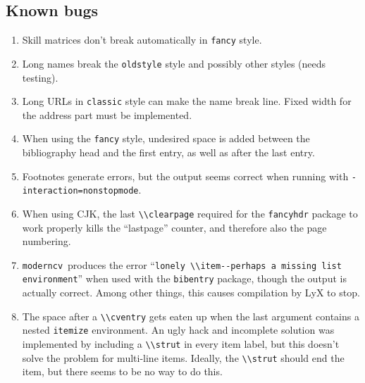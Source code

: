 \documentclass[a4paper, 11pt]{article}
\newcommand{\code}[1]{\lstinline!#1!}
\newcommand{\moderncv}{\code{moderncv}}
\newcommand{\Moderncv}{\moderncv~}
\begin{document}
\subsection{Known bugs}
\begin{enumerate}
  \item Skill matrices don't break automatically in \texttt{fancy} style.
  \item Long names break the \texttt{oldstyle} style and possibly other styles (needs testing).
  \item Long URLs in \texttt{classic} style can make the name break line.
  Fixed width for the address part must be implemented.
  \item When using the \texttt{fancy} style, undesired space is added between the bibliography head and the first entry, as well as after the last entry.
  \item Footnotes generate errors, but the output seems correct when running with \code{-interaction=nonstopmode}.
  \item When using CJK, the last \code{\\clearpage} required for the \code{fancyhdr} package to work properly kills the ``lastpage'' counter, and therefore also the page numbering.
  \item \Moderncv produces the error ``\code{lonely \\item--perhaps a missing list environment}'' when used with the \code{bibentry} package, though the output is actually correct.
  Among other things, this causes compilation by LyX to stop.
  \item The space after a \code{\\cventry} gets eaten up when the last argument contains a nested \code{itemize} environment.
  An ugly hack and incomplete solution was implemented by including a \code{\\strut} in every item label, but this doesn't solve the problem for multi-line items.
  Ideally, the \code{\\strut} should end the item, but there seems to be no way to do this.
\end{enumerate}
\end{document}
